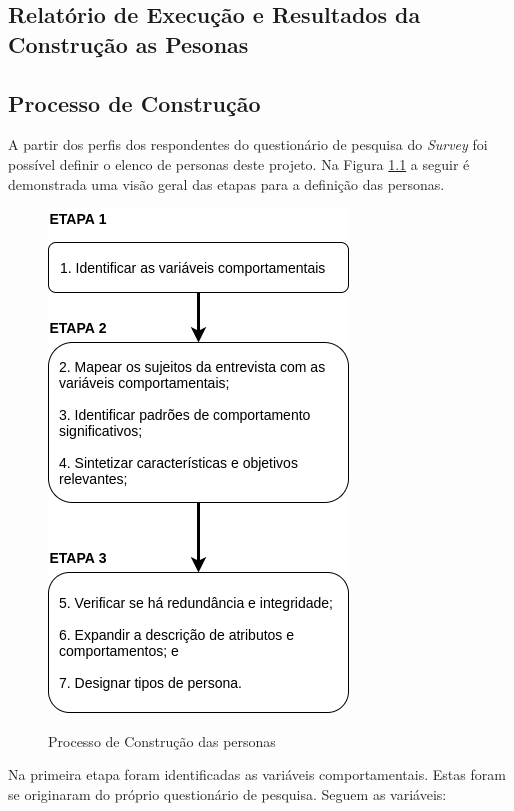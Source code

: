 \begin{apendicesenv}
\chapter{Relatório de Execução e Resultados da Construção as Pesonas}
\label{ap:persona}

\section{Processo de Construção}

A partir dos perfis dos respondentes do questionário de pesquisa do \textit{Survey} foi possível definir o elenco de personas deste projeto. Na Figura \ref{Fig:process_persona.png} a seguir é demonstrada uma visão geral das etapas para a definição das personas.

\begin{figure}[htbp]
	\centering
	\caption{Processo de Construção das personas}
	\includegraphics[keepaspectratio=true,scale=0.8]{figuras/personas/process_persona.png}
	\label{Fig:process_persona.png}
\end{figure}

Na primeira etapa foram identificadas as variáveis comportamentais. Estas foram se originaram do próprio questionário de pesquisa. Seguem as variáveis:


\end{apendicesenv}
